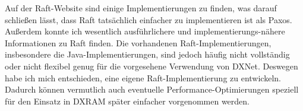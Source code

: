 Auf der Raft-Website sind einige Implementierungen zu finden, was darauf schließen lässt, dass Raft tatsächlich einfacher zu implementieren ist als Paxos. Außerdem konnte ich wesentlich ausführlichere und implementierungs-nähere Informationen zu Raft finden. Die vorhandenen Raft-Implementierungen, insbesondere die Java-Implementierungen, sind jedoch häufig nicht vollständig oder nicht flexibel genug für die vorgesehene Verwendung von DXNet. Deswegen habe ich mich entschieden, eine eigene Raft-Implementierung zu entwickeln. Dadurch können vermutlich auch eventuelle Performance-Optimierungen speziell für den Einsatz in DXRAM später einfacher vorgenommen werden.
